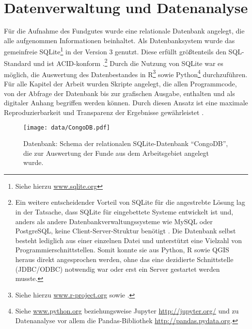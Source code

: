 \section{Datenverwaltung und Datenanalyse}\label{sec:Datenhaltung}


Für die Aufnahme des Fundgutes wurde eine relationale Datenbank angelegt, die alle aufgenommen Informationen beinhaltet. Als Datenbanksystem wurde das gemeinfreie SQLite\footnote{Siehe hierzu \url{www.sqlite.org}} in der Version 3 genutzt. Diese erfüllt größtenteils den SQL-Standard und ist ACID-konform \parencite[299f.]{Kemper.2013}.\footnote{Ein weitere entscheidender Vorteil von SQLite für die angestrebte Lösung lag in der Tatsache, dass SQLite für eingebettete Systeme entwickelt ist und, anders als andere Datenbankverwaltungssysteme wie MySQL oder PostgreSQL, keine Client-Server-Struktur benötigt \parencite[siehe][1--6]{Kreibich.2010}. Die Datenbank selbst besteht lediglich aus einer einzelnen Datei und unterstützt eine Vielzahl von Programmierschnittstellen. Somit konnte sie aus Python, R sowie QGIS heraus direkt angesprochen werden, ohne das eine dezidierte Schnittstelle (JDBC/ODBC) notwendig war oder erst ein Server gestartet werden musste.} Durch die Nutzung von SQLite war es möglich, die Auswertung des Datenbestandes in R\footnote{Siehe hierzu \url{www.r-project.org} sowie \parencite{Tippmann.2015}.}\parencite{RDevelopmentCoreTeam.2008} sowie Python\footnote{Siehe \url{www.python.org} beziehungsweise Jupyter \url{http://jupyter.org/} und zu Datenanalyse vor allem die Pandas-Bibliothek \url{http://pandas.pydata.org}.} \parencite{Perez.2007} durchzuführen. Für alle Kapitel der Arbeit wurden Skripte angelegt, die allen Programmcode, von der Abfrage der Datenbank bis zur grafischen Ausgabe, enthalten und als digitaler Anhang begriffen werden können. Durch diesen Ansatz ist eine maximale Reproduzierbarkeit und Transparenz der Ergebnisse gewährleistet \parencite[siehe][]{Marwick.2017}.

\begin{figure*}[!tb]
	\centering
	\texttt{[image: data/CongoDB.pdf]}
	\caption{Datenbank: Schema der relationalen SQLite-Datenbank \enquote{CongoDB}, die zur Auswertung der Funde aus dem Arbeitsgebiet angelegt wurde.}
	\label{fig:DB-Schema}
\end{figure*}

